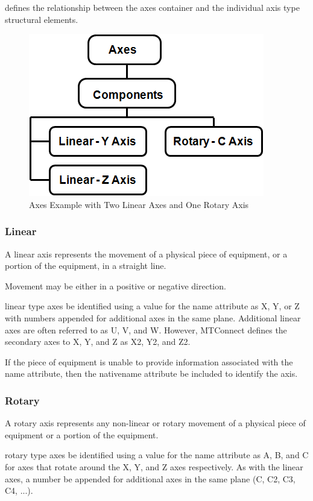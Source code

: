 \documentclass{mtconnect}	%
\begin{document}
 defines the relationship between the \gls{axes} container and the individual axis type \glspl{structural element}.

\begin{figure}[ht]
  \centering
  \includegraphics[width=.5\textwidth]{figures/axes-example-two-linear-one-rotary.png}
  \caption{Axes Example with Two Linear Axes and One Rotary Axis}
  \label{fig:axes-example-two-linear-one-rotary}
\end{figure}

\FloatBarrier

\subsubsection{Linear}

A \gls{linear} axis represents the movement of a physical piece of equipment, or a portion of the equipment, in a straight line.

Movement may be either in a positive or negative direction.

\gls{linear} type axes \must be identified using a value for the name attribute as X, Y, or Z with numbers appended for additional axes in the same plane.  Additional linear axes are often referred to as U, V, and W.   However, MTConnect defines the secondary axes to X, Y, and Z as X2, Y2, and Z2.

If the piece of equipment is unable to provide information associated with the \gls{name} attribute, then the \gls{nativename} attribute \must be included to identify the axis.

\subsubsection{Rotary}

A \gls{rotary} axis represents any non-linear or rotary movement of a physical piece of equipment or a portion of the equipment.

\gls{rotary} type axes \must be identified using a value for the \gls{name} attribute as A, B, and C for axes that rotate around the X, Y, and Z axes respectively.  As with the \gls{linear} axes, a number \must be appended for additional axes in the same plane (C, C2, C3, C4, ...).
\end{document}
